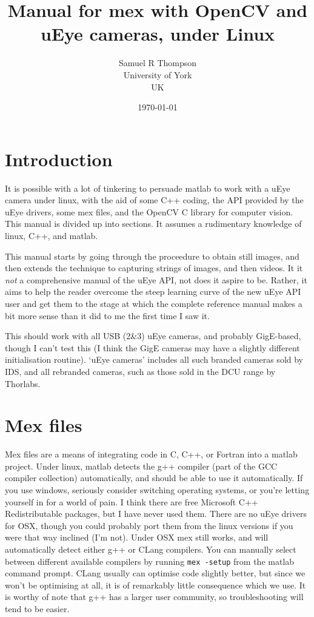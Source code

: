 \documentclass[12pt,a4paper]{article}
\title{\textbf{Manual for mex with OpenCV and uEye cameras, under Linux}}
\author{Samuel R Thompson\\
		University of York\\
		UK}
\date{\today}
\begin{document}
\maketitle

\tableofcontents

\section{Introduction}
It is possible with a lot of tinkering to persuade matlab to work with a uEye camera under linux, with the aid of some C++ coding, the API provided by the uEye drivers, some mex files, and the OpenCV C library for computer vision. This manual is divided up into sections. It assumes a rudimentary knowledge of linux, C++, and matlab.

This manual starts by going through the proceedure to obtain still images, and then extends the technique to capturing strings of images, and then videos. It it \emph{not} a comprehensive manual of the uEye API, not does it aspire to be. Rather, it aims to help the reader overcome the steep learning curve of the new uEye API user and get them to the stage at which the complete reference manual makes a bit more sense than it did to me the first time I saw it.

 This should work with all USB (2\&3) uEye cameras, and probably GigE-based, though I can't test this (I think the GigE cameras may have a slightly different initialisation routine). `uEye cameras' includes all such branded cameras sold by IDS, and all rebranded cameras, such as those sold in the DCU range by Thorlabs.


\section{Mex files}


Mex files are a means of integrating code in C, C++, or Fortran into a matlab project. Under linux, matlab detects the g++ compiler (part of the GCC compiler collection) automatically, and should be able to use it automatically. If you use windows, seriously consider switching operating systems, or you're letting yourself in for a world of pain. I think there are free Microsoft C++ Redistributable packages, but I have never used them. There are no uEye drivers for OSX, though you could probably port them from the linux versions if you were that way inclined (I'm not). Under OSX mex still works, and will automatically detect either g++ or CLang compilers. You can manually select between different available compilers by running \texttt{mex -setup} from the matlab command prompt. CLang usually can optimise code slightly better, but since we won't be optimising at all, it is of remarkably little consequence which we use. It is worthy of note that g++ has a larger user community, so troubleshooting will tend to be easier.
\end{document}
